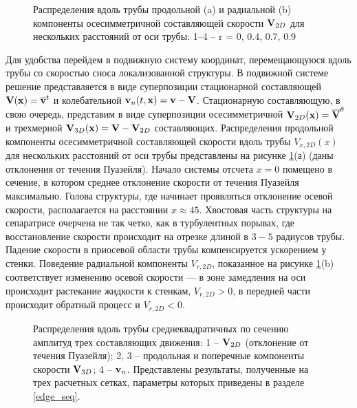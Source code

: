 \begin{figure}
\caption{Распределения вдоль трубы продольной (a) и радиальной (b) компоненты осесимметричной составляющей скорости $\mathbf{V}_{2D}$ для нескольких расстояний от оси трубы: 1–4 – r = 0, 0.4, 0.7, 0.9}
\label{U2D_pic}
\end{figure}

Для удобства перейдем в подвижную систему координат, перемещающуюся вдоль трубы со скоростью сноса локализованной структуры. В подвижной системе решение представляется в виде суперпозиции стационарной составляющей $\mathbf{V}(\mathbf{x}) = \overline{\mathbf{v}}^t$ и колебательной $\mathbf{v}_n(t,\mathbf{x}) = \mathbf{v} - \mathbf{V}$. Стационарную составляющую, в свою очередь, представим в виде суперпозиции осесимметричной $\mathbf{V}_{2D}(\mathbf{x}) = \overline{\mathbf{V}}^{\theta}$ и трехмерной $\mathbf{V}_{3D}(\mathbf{x}) = \mathbf{V} - \mathbf{V}_{2D}$ составляющих. Распределения продольной компоненты осесимметричной составляющей скорости вдоль трубы $V_{x,2D}(x)$ для нескольких расстояний от оси трубы представлены на рисунке \ref{U2D_pic}(а) (даны отклонения от течения Пуазейля). Начало системы отсчета $x=0$ помещено в сечение, в котором среднее отклонение скорости от течения Пуазейля максимально. Голова структуры, где начинает проявляться отклонение осевой скорости, располагается на расстоянии $x \approx 45$. Хвостовая часть структуры на сепаратрисе очерчена не так четко, как в турбулентных порывах, где восстановление скорости происходит на отрезке длиной в $3-5$ радиусов трубы.  Падение скорости в приосевой области трубы компенсируется ускорением у стенки. Поведение радиальной компоненты $V_{r,2D}$, показанное на рисунке \ref{U2D_pic}(b) соответствует изменению осевой скорости --- в зоне замедления на оси происходит растекание жидкости к стенкам, $V_{r,2D}>0$, в передней части происходит обратный процесс и $V_{r,2D}<0$.

\begin{figure}
\caption{Распределения вдоль трубы среднеквадратичных по сечению амплитуд трех составляющих движения: 1 -- $\mathbf{V}_{2D}$ (отклонение от течения Пуазейля); 2, 3 -- продольная и поперечные компоненты скорости $\mathbf{V}_{3D}$; 4 -- $\mathbf{v}_{n}$. Представлены результаты, полученные на трех расчетных сетках, параметры которых приведены в разделе \ref{edge_seq}. }
\label{amp_pic}
\end{figure}

